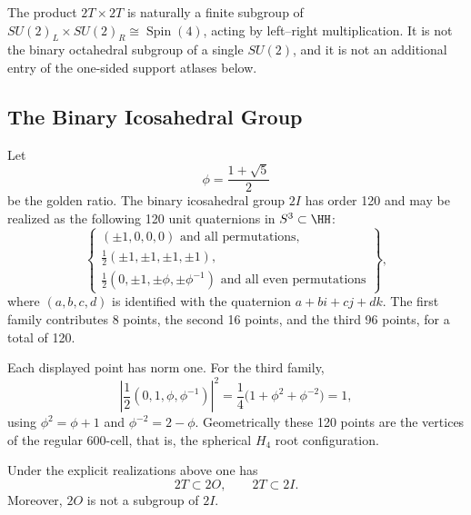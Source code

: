 \documentclass[11pt]{article}
\begin{document}
\begin{remark}
The product \(2T\times2T\) is naturally a finite subgroup of
\(SU(2)_L\times SU(2)_R\cong\operatorname{Spin}(4)\), acting by left--right multiplication.
It is not the binary octahedral subgroup of a single \(SU(2)\), and it is not
an additional entry of the one-sided support atlases below.
\end{remark}

\subsection{The Binary Icosahedral Group}

Let
\begin{equation}
\phi = \frac{1+\sqrt{5}}{2}
\end{equation}
be the golden ratio. The binary icosahedral group $2I$ has order 120 and may
be realized as the following 120 unit quaternions in $S^3 \subset \HH$:
\begin{equation}
\label{p1:eq:2I-explicit}
\left\{
\begin{array}{l}
(\pm 1,0,0,0) \text{ and all permutations}, \\
\frac{1}{2}(\pm 1, \pm 1, \pm 1, \pm 1), \\
\frac{1}{2}(0, \pm 1, \pm \phi, \pm \phi^{-1}) \text{ and all even permutations}
\end{array}
\right\},
\end{equation}
where $(a,b,c,d)$ is identified with the quaternion $a+bi+cj+dk$.
The first family contributes 8 points, the second 16 points, and the third
96 points, for a total of 120.
\cite{coxeter1973regular,conwaySloane1999sphere}

Each displayed point has norm one. For the third family,
\begin{equation}
\left|\frac{1}{2}(0,1,\phi,\phi^{-1})\right|^2
= \frac{1}{4}\bigl(1+\phi^2+\phi^{-2}\bigr) = 1,
\end{equation}
using $\phi^2=\phi+1$ and $\phi^{-2}=2-\phi$.
Geometrically these 120 points are the vertices of the regular 600-cell,
that is, the spherical $H_4$ root configuration.
\cite{coxeter1973regular,conwaySloane1999sphere}



\begin{proposition}
\label{p1:prop:exceptional-nesting}
Under the explicit realizations above one has
\begin{equation}
2T \subset 2O, \qquad 2T \subset 2I.
\end{equation}
Moreover, $2O$ is not a subgroup of $2I$.
\end{proposition}
\end{document}
